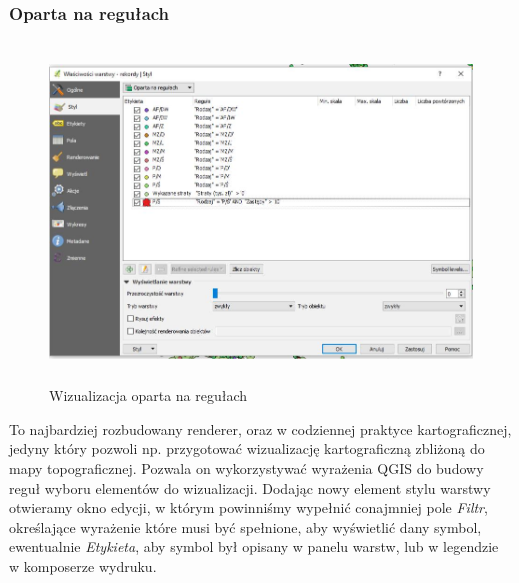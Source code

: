 \documentclass[12pt,a4paper]{book}
\begin{document}
\subsubsection{Oparta na regułach}

\begin{center}
\begin{figure}
\includegraphics[width=13cm,height=9.006cm]{007-reguly.jpg}
\caption{Wizualizacja oparta na regułach}
\end{figure}
\end{center}
To najbardziej rozbudowany  renderer, oraz w codziennej praktyce kartograficznej, jedyny który pozwoli np. przygotować wizualizację kartograficzną zbliżoną do mapy topograficznej. Pozwala on wykorzystywać wyrażenia QGIS do budowy reguł wyboru elementów do wizualizacji. Dodając nowy element stylu warstwy otwieramy okno edycji, w którym powinniśmy wypełnić conajmniej pole \textit{Filtr}, określające wyrażenie które musi być spełnione, aby wyświetlić dany symbol, ewentualnie \textit{Etykieta}, aby symbol był opisany w panelu warstw, lub w legendzie w komposerze wydruku.
\end{document}
